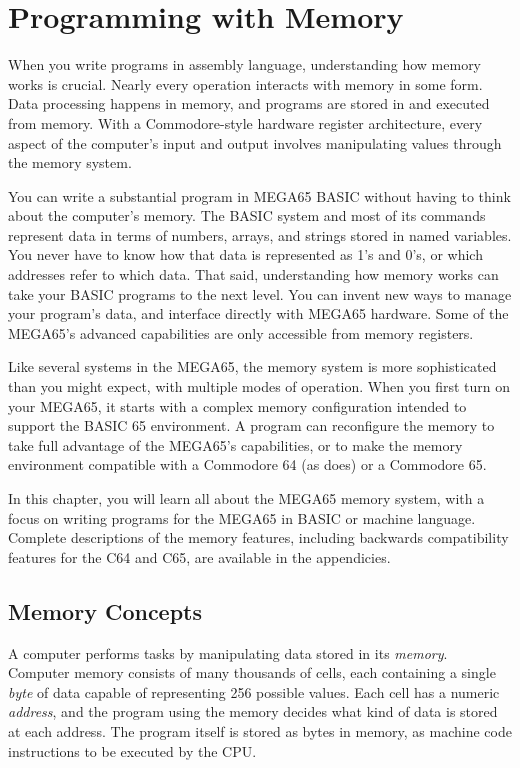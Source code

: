 
\chapter{Programming with Memory}
\label{cha:programming-with-memory}

When you write programs in assembly language, understanding how memory works is
crucial. Nearly every operation interacts with memory in some form. Data
processing happens in memory, and programs are stored in and executed from memory.
With a Commodore-style hardware register architecture, every aspect of the
computer's input and output involves manipulating values through the memory system.

You can write a substantial program in MEGA65 BASIC without having to
think about the computer's memory. The BASIC system and most of its commands
represent data in terms of numbers, arrays, and strings stored in named variables.
You never have to know how that data is represented as 1's and 0's, or which addresses
refer to which data. That said, understanding how memory works can take your
BASIC programs to the next level. You can invent new ways to manage your
program's data, and interface directly with MEGA65 hardware. Some of the
MEGA65's advanced capabilities are only accessible from memory registers.

Like several systems in the MEGA65, the memory system is more sophisticated than you
might expect, with multiple modes of operation. When you first turn on your
MEGA65, it starts with a complex memory configuration intended to support the
BASIC 65 environment. A program can reconfigure the memory to take full
advantage of the MEGA65's capabilities, or to make the memory environment
compatible with a Commodore 64 (as  does) or a Commodore 65.

In this chapter, you will learn all about the MEGA65 memory system, with a
focus on writing programs for the MEGA65 in BASIC or machine language. Complete
descriptions of the memory features, including backwards compatibility features
for the C64 and C65, are available in the appendicies.

\newpage
\section{Memory Concepts}
\label{sec:programming-with-memory-concepts}

A computer performs tasks by manipulating data stored in its {\em memory}.
Computer memory consists of many thousands of cells, each containing a single
{\em byte} of data capable of representing 256 possible values. Each cell has a numeric
{\em address}, and the program using the memory decides what kind of data is stored
at each address. The program itself is stored as bytes in memory, as
machine code instructions to be executed by the CPU.

